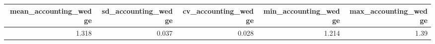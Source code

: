 
\begin{tabular}{rrrrr}
\toprule
mean_accounting_wedge & sd_accounting_wedge & cv_accounting_wedge & min_accounting_wedge & max_accounting_wedge\\
\midrule
1.318 & 0.037 & 0.028 & 1.214 & 1.39\\
\bottomrule
\end{tabular}
